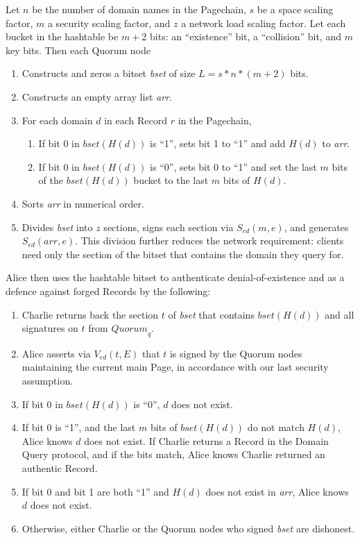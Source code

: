 \documentclass{sig-alternate}
\begin{document}
Let $ n $ be the number of domain names in the Pagechain, $ s $ be a space scaling factor, $ m $ a security scaling factor, and $ z $ a network load scaling factor. Let each bucket in the hashtable be $ m + 2 $ bits: an ``existence'' bit, a ``collision'' bit, and $ m $ key bits. Then each Quorum node

\begin{enumerate}
	\item Constructs and zeros a bitset \emph{bset} of size $ L = s * n * (m + 2) $ bits.
	\item Constructs an empty array list \emph{arr}.
	\item For each domain $ d $ in each Record $ r $ in the Pagechain,
		\begin{enumerate}
			\item If bit 0 in $ \mathit{bset}(H(d)) $ is ``1'', sets bit 1 to ``1'' and add $ H(d) $ to \emph{arr}.
			\item If bit 0 in $ \mathit{bset}(H(d)) $ is ``0'', sets bit 0 to ``1'' and set the last $ m $ bits of the $ \mathit{bset}(H(d)) $ bucket to the last $ m $ bits of $ H(d) $.
		\end{enumerate}
	\item Sorts \emph{arr} in numerical order.
	\item Divides \emph{bset} into $ z $ sections, signs each section via $ S_{\mathit{ed}}(m, e) $, and generates $ S_{\mathit{ed}}(\mathit{arr}, e) $. This division further reduces the network requirement: clients need only the section of the bitset that contains the domain they query for.
\end{enumerate}

Alice then uses the hashtable bitset to authenticate denial-of-existence and as a defence against forged Records by the following:

\begin{enumerate}
	\item Charlie returns back the section $ t $ of \emph{bset} that contains $ \mathit{bset}(H(d)) $ and all signatures on $ t $ from $ \mathit{Quorum}_{q} $.
	\item Alice asserts via $ V_{\mathit{ed}}(t, E) $ that $ t $ is signed by the Quorum nodes maintaining the current main Page, in accordance with our last security assumption.
	\item If bit 0 in $ \mathit{bset}(H(d)) $ is ``0'', $ d $ does not exist.
	\item If bit 0 is ``1'', and the last $ m $ bits of $ \mathit{bset}(H(d)) $ do not match $ H(d) $, Alice knows $ d $ does not exist. If Charlie returns a Record in the Domain Query protocol, and if the bits match, Alice knows Charlie returned an authentic Record.
	\item If bit 0 and bit 1 are both ``1'' and $ H(d) $ does not exist in \emph{arr}, Alice knows $ d $ does not exist.
	\item Otherwise, either Charlie or the Quorum nodes who signed \emph{bset} are dishonest.
\end{enumerate}
\end{document}
